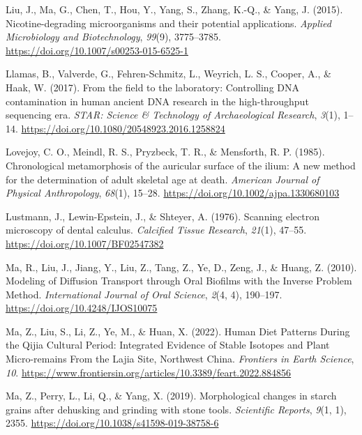 \documentclass[
  letterpaper,
]{book}
\newlength{\cslhangindent}
\newlength{\cslentryspacingunit} %
\newenvironment{CSLReferences}[2] %
 {%
  \setlength{\parindent}{0pt}
  \ifodd #1
  \let\oldpar\par
  \def\par{\hangindent=\cslhangindent\oldpar}
  \fi
  \setlength{\parskip}{#2\cslentryspacingunit}
 }%
 {}
\begin{document}
\begin{CSLReferences}{1}{0}
\leavevmode{}%
Liu, J., Ma, G., Chen, T., Hou, Y., Yang, S., Zhang, K.-Q., \& Yang, J.
(2015). Nicotine-degrading microorganisms and their potential
applications. \emph{Applied Microbiology and Biotechnology},
\emph{99}(9), 3775--3785.
\url{https://doi.org/10.1007/s00253-015-6525-1}

\leavevmode{}%
Llamas, B., Valverde, G., Fehren-Schmitz, L., Weyrich, L. S., Cooper,
A., \& Haak, W. (2017). From the field to the laboratory: {Controlling
DNA} contamination in human ancient {DNA} research in the
high-throughput sequencing era. \emph{STAR: Science \& Technology of
Archaeological Research}, \emph{3}(1), 1--14.
\url{https://doi.org/10.1080/20548923.2016.1258824}

\leavevmode{}%
Lovejoy, C. O., Meindl, R. S., Pryzbeck, T. R., \& Mensforth, R. P.
(1985). Chronological metamorphosis of the auricular surface of the
ilium: {A} new method for the determination of adult skeletal age at
death. \emph{American Journal of Physical Anthropology}, \emph{68}(1),
15--28. \url{https://doi.org/10.1002/ajpa.1330680103}

\leavevmode{}%
Lustmann, J., Lewin-Epstein, J., \& Shteyer, A. (1976). Scanning
electron microscopy of dental calculus. \emph{Calcified Tissue
Research}, \emph{21}(1), 47--55.
\url{https://doi.org/10.1007/BF02547382}

\leavevmode{}%
Ma, R., Liu, J., Jiang, Y., Liu, Z., Tang, Z., Ye, D., Zeng, J., \&
Huang, Z. (2010). Modeling of {Diffusion Transport} through {Oral
Biofilms} with the {Inverse Problem Method}. \emph{International Journal
of Oral Science}, \emph{2}(4, 4), 190--197.
\url{https://doi.org/10.4248/IJOS10075}

\leavevmode{}%
Ma, Z., Liu, S., Li, Z., Ye, M., \& Huan, X. (2022). Human {Diet
Patterns During} the {Qijia Cultural Period}: {Integrated Evidence} of
{Stable Isotopes} and {Plant Micro-remains From} the {Lajia Site},
{Northwest China}. \emph{Frontiers in Earth Science}, \emph{10}.
\url{https://www.frontiersin.org/articles/10.3389/feart.2022.884856}

\leavevmode{}%
Ma, Z., Perry, L., Li, Q., \& Yang, X. (2019). Morphological changes in
starch grains after dehusking and grinding with stone tools.
\emph{Scientific Reports}, \emph{9}(1, 1), 2355.
\url{https://doi.org/10.1038/s41598-019-38758-6}


\end{CSLReferences}
\end{document}
